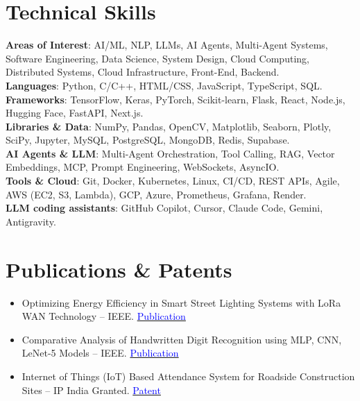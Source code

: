 \documentclass[a4paper,11pt]{article}
\newcommand{\resumeItemListStart}{\begin{itemize}[leftmargin=1.5em, rightmargin=0.2em, itemsep=-1pt, parsep=0pt, topsep=2pt]}
\newcommand{\resumeItemListEnd}{\end{itemize}\vspace{-4pt}}
\newcommand{\resumeItem}[1]{\item\small{#1}}
\begin{document}
\section{Technical Skills}
\begin{itemize}[leftmargin=0.1in, label={}]
  \small{\item{
    \textbf{Areas of Interest}{: AI/ML, NLP, LLMs, AI Agents, Multi-Agent Systems, Software Engineering, Data Science, System Design, Cloud Computing, Distributed Systems, Cloud Infrastructure, Front-End, Backend.} \\
    \textbf{Languages}{: Python, C/C++, HTML/CSS, JavaScript, TypeScript, SQL.} \\
    \textbf{Frameworks}{: TensorFlow, Keras, PyTorch, Scikit-learn, Flask, React, Node.js, Hugging Face, FastAPI, Next.js.} \\
    \textbf{Libraries \& Data}{: NumPy, Pandas, OpenCV, Matplotlib, Seaborn, Plotly, SciPy, Jupyter, MySQL, PostgreSQL, MongoDB, Redis, Supabase.} \\
    \textbf{AI Agents \& LLM}{: Multi-Agent Orchestration, Tool Calling, RAG, Vector Embeddings, MCP, Prompt Engineering, WebSockets, AsyncIO.} \\
    \textbf{Tools \& Cloud}{: Git, Docker, Kubernetes, Linux, CI/CD, REST APIs, Agile, AWS (EC2, S3, Lambda), GCP, Azure, Prometheus, Grafana, Render.} \\
    \textbf{LLM coding assistants}{: GitHub Copilot, Cursor, Claude Code, Gemini, Antigravity.} \\
  }}
\end{itemize}
\vspace{-25pt}

\section{Publications \& Patents}
\resumeItemListStart
  \resumeItem{Optimizing Energy Efficiency in Smart Street Lighting Systems with LoRa WAN Technology -- IEEE. \hfill \href{https://ieeexplore.ieee.org/document/10527564}{\textcolor{blue}{Publication}}}
  \resumeItem{Comparative Analysis of Handwritten Digit Recognition using MLP, CNN, LeNet-5 Models -- IEEE. \hfill \href{https://ieeexplore.ieee.org/document/10939547}{\textcolor{blue}{Publication}}}
  \resumeItem{Internet of Things (IoT) Based Attendance System for Roadside Construction Sites -- IP India Granted. \hfill \href{https://drive.google.com/file/d/1zTYg7hnRU_YZuY8qC2AFABGL-V3i2Cie/view?usp=sharing}{\textcolor{blue}{Patent}}}
\resumeItemListEnd
\end{document}
